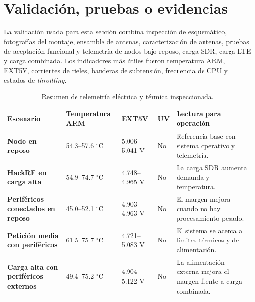 \section{Validación, pruebas o evidencias}

La validación usada para esta sección combina inspección de esquemático,
fotografías del montaje, ensamble de antenas, caracterización de antenas,
pruebas de aceptación funcional y telemetría de nodos bajo reposo, carga SDR,
carga LTE y carga combinada. Los indicadores más útiles fueron temperatura ARM,
EXT5V, corrientes de rieles, banderas de subtensión, frecuencia de CPU y estados
de \textit{throttling}.

\begin{table}[H]
\centering
\caption{Resumen de telemetría eléctrica y térmica inspeccionada.}
\label{tab:hw_telemetria}
\begin{tabularx}{\textwidth}{>{\bfseries}p{3cm} p{2.4cm} p{2.1cm} p{1.4cm} X}
\toprule
Escenario & Temperatura ARM & EXT5V & UV & Lectura para operación \\
\midrule
Nodo en reposo & 54.3--57.6 $^\circ$C & 5.006--5.041 V & No & Referencia base con sistema operativo y telemetría. \\
HackRF en carga alta & 54.9--74.7 $^\circ$C & 4.748--4.965 V & No & La carga SDR aumenta demanda y temperatura. \\
Periféricos conectados en reposo & 45.0--52.1 $^\circ$C & 4.903--4.963 V & No & El margen mejora cuando no hay procesamiento pesado. \\
Petición media con periféricos & 61.5--75.7 $^\circ$C & 4.721--5.083 V & No & El sistema se acerca a límites térmicos y de alimentación. \\
Carga alta con periféricos externos & 49.4--75.2 $^\circ$C & 4.904--5.122 V & No & La alimentación externa mejora el margen frente a carga combinada. \\
\bottomrule
\end{tabularx}
\end{table}

